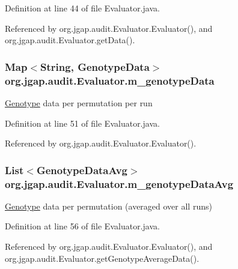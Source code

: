 Definition at line 44 of file Evaluator.\-java.



Referenced by org.\-jgap.\-audit.\-Evaluator.\-Evaluator(), and org.\-jgap.\-audit.\-Evaluator.\-get\-Data().

\hypertarget{classorg_1_1jgap_1_1audit_1_1_evaluator_ae43c46df70ad2023f57b30b9cf039000}{
\subsubsection[{m\-\_\-genotype\-Data}]{\setlength{\rightskip}{0pt plus 5cm}Map$<$String, {\bf Genotype\-Data}$>$ org.\-jgap.\-audit.\-Evaluator.\-m\-\_\-genotype\-Data\hspace{0.3cm}{\ttfamily [private]}}}\label{classorg_1_1jgap_1_1audit_1_1_evaluator_ae43c46df70ad2023f57b30b9cf039000}
\hyperlink{classorg_1_1jgap_1_1_genotype}{Genotype} data per permutation per run 

Definition at line 51 of file Evaluator.\-java.



Referenced by org.\-jgap.\-audit.\-Evaluator.\-Evaluator().

\hypertarget{classorg_1_1jgap_1_1audit_1_1_evaluator_ac0acc7588da13daadeb981c1acc755ec}{
\subsubsection[{m\-\_\-genotype\-Data\-Avg}]{\setlength{\rightskip}{0pt plus 5cm}List$<${\bf Genotype\-Data\-Avg}$>$ org.\-jgap.\-audit.\-Evaluator.\-m\-\_\-genotype\-Data\-Avg\hspace{0.3cm}{\ttfamily [private]}}}\label{classorg_1_1jgap_1_1audit_1_1_evaluator_ac0acc7588da13daadeb981c1acc755ec}
\hyperlink{classorg_1_1jgap_1_1_genotype}{Genotype} data per permutation (averaged over all runs) 

Definition at line 56 of file Evaluator.\-java.



Referenced by org.\-jgap.\-audit.\-Evaluator.\-Evaluator(), and org.\-jgap.\-audit.\-Evaluator.\-get\-Genotype\-Average\-Data().

